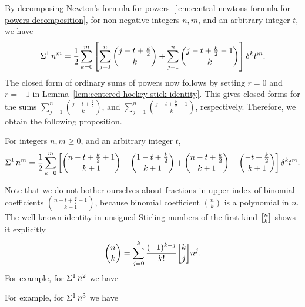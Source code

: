 By decomposing Newton's formula for powers~\eqref{lem:central-newtons-formula-for-powers-decomposition},
for non-negative integers $n,m$, and an arbitrary integer $t$, we have
\begin{align*}
  \Sigma^{1}\,{n}^{m} = \frac{1}{2} \sum_{k=0}^{m}
  \left[
    \sum_{j=1}^{n} \binom{j-t+\frac{k}{2}}{k} + \sum_{j=1}^{n} \binom{j-t+\frac{k}{2}-1}{k}
  \right] \delta^{k} t^m.
\end{align*}
The closed form of ordinary sums of powers now follows by setting $r=0$ and $r=-1$ in
Lemma~\eqref{lem:centered-hockey-stick-identity}.
This gives closed forms for
the sums $\sum_{j=1}^{n} \binom{j -t + \frac{k}{2}}{k}$,
and $\sum_{j=1}^{n} \binom{j -t + \frac{k}{2}-1}{k}$, respectively.
Therefore, we obtain the following proposition.
\begin{proposition}
  \label{prop:ordinary-sums-of-powers-decomposition}
  For integers $n,m \geq 0$, and an arbitrary integer $t$,
  \begin{align*}
    \Sigma^{1}\,{n}^{m} = \frac{1}{2} \sum_{k=0}^{m}
    \left[
      \binom{n -t + \frac{k}{2} +1}{k+1} - \binom{1 -t + \tfrac{k}{2}}{k+1}
      + \binom{n -t + \frac{k}{2}}{k+1} - \binom{-t + \tfrac{k}{2}}{k+1}
    \right] \delta^{k} t^m.
  \end{align*}
\end{proposition}
Note that we do not bother ourselves about fractions in upper index of binomial
coefficients $\binom{n -t + \frac{k}{2} +1}{k+1}$, because binomial coefficient
$\binom{n}{k}$ is
a polynomial in $n$.
The well-known identity in unsigned Stirling numbers of the first kind $\stirlingi{n}{k}$
shows it explicitly
\begin{align*}
  \binom{n}{k}
  = \sum_{j=0}^{k} \frac{(-1)^{k-j}}{k!} \stirlingi{k}{j} n^j.
\end{align*}
For example, for $\Sigma^{1}\,{n}^{2}$ we have

For example, for $\Sigma^{1}\,{n}^{3}$ we have


